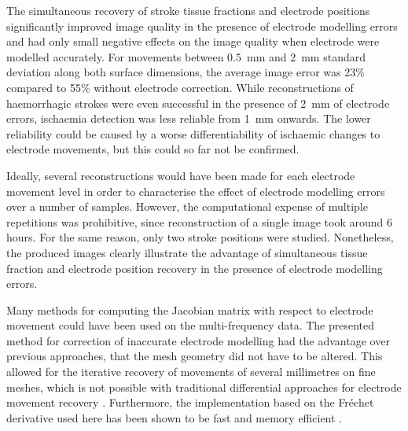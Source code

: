 The simultaneous recovery of stroke tissue fractions and electrode positions significantly improved image quality in the presence of electrode modelling errors and had only small negative effects on the image quality when electrode were modelled accurately. For movements between \SI{0.5}{\milli\metre} and \SI{2}{\milli\metre} standard deviation along both surface dimensions, the average image error was 23\% compared to 55\% without electrode correction. While reconstructions of haemorrhagic strokes were even successful in the presence of \SI{2}{\milli\metre} of electrode errors, ischaemia detection was less reliable from \SI{1}{\milli\metre} onwards. The lower reliability could be caused by a worse differentiability of ischaemic changes to electrode movements, but this could so far not be confirmed.

Ideally, several reconstructions would have been made for each electrode movement level in order to characterise the effect of electrode modelling errors over a number of samples. However, the computational expense of multiple repetitions was prohibitive, since reconstruction of a single image took around 6 hours. For the same reason, only two stroke positions were studied. Nonetheless, the produced images clearly illustrate the advantage of simultaneous tissue fraction and electrode position recovery in the presence of electrode modelling errors.

Many methods for computing the Jacobian matrix with respect to electrode movement could have been used on the multi-frequency data. The presented method for correction of inaccurate electrode modelling had the advantage over previous approaches, that the mesh geometry did not have to be altered. This allowed for the iterative recovery of movements of several millimetres on fine meshes, which is not possible with traditional differential approaches for electrode movement recovery \citep{Soleimani2006}. Furthermore, the implementation based on the Fr\'{e}chet derivative \citep{Darde2012} used here has been shown to be fast and memory efficient \citep{Jehl2015b}.